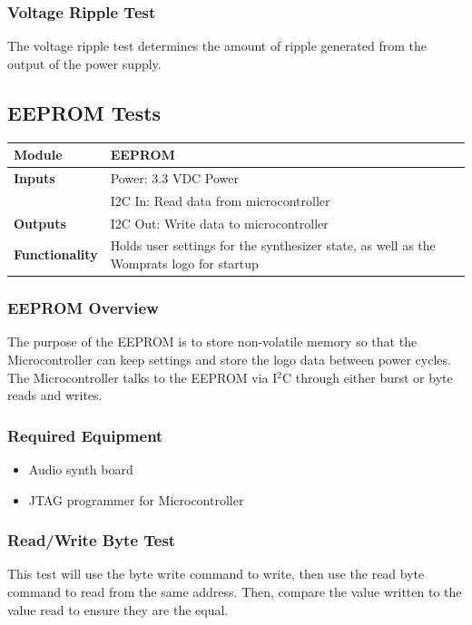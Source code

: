 \documentclass{article}
\begin{document}
\subsubsection{Voltage Ripple Test}
The voltage ripple test determines the amount of ripple generated from the output of the power supply.  

\subsection{EEPROM Tests}

\begin{tabular}{|p{1in}|p{5in}|}
\hline
\textbf{Module} & EEPROM \\
\hline
\textbf{Inputs}& Power: 3.3 VDC Power\\
	     & I2C In: Read data from microcontroller \\
\hline
\textbf{Outputs}& I2C Out: Write data to microcontroller \\ 
\hline
\textbf{Functionality}& Holds user settings for the synthesizer state, as well as the Womprats logo for startup\\
\hline
\end{tabular}
\subsubsection{EEPROM Overview}
The purpose of the EEPROM is to store non-volatile memory so that the Microcontroller can keep settings and store the logo data between power cycles. The Microcontroller talks to the EEPROM via I$^2$C through either burst or byte reads and writes.
\subsubsection{Required Equipment}
\begin{itemize}
\item Audio synth board
\item JTAG programmer for Microcontroller
\end{itemize}
\subsubsection{Read/Write Byte Test}
This test will use the byte write command to write, then use the read byte command to read from the same address. Then, compare the value written to the value read to ensure they are the equal.
\end{document}

